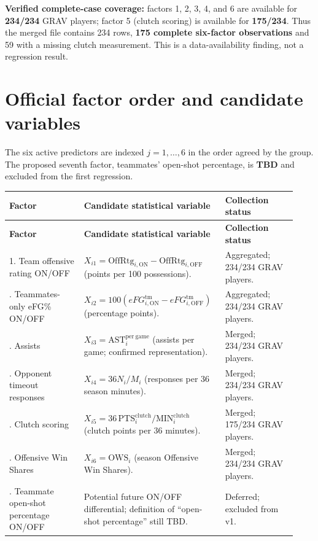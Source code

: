 \documentclass[11pt]{article}
\begin{document}
\textbf{Verified complete-case coverage:} factors 1, 2, 3, 4, and 6 are
available for \textbf{234/234} GRAV players; factor 5 (clutch scoring) is
available for \textbf{175/234}. Thus the merged file contains 234 rows,
\textbf{175 complete six-factor observations} and 59 with a missing clutch
measurement. This is a data-availability finding, not a regression result.

\section{Official factor order and candidate variables}
The six active predictors are indexed $j=1,\dots,6$ in the order agreed by
the group. The proposed seventh factor, teammates' open-shot percentage, is
\textbf{TBD} and excluded from the first regression.

\small
\begin{longtable}{@{}p{0.25\linewidth}p{0.44\linewidth}p{0.24\linewidth}@{}}
\toprule
\textbf{Factor} & \textbf{Candidate statistical variable} & \textbf{Collection status}\\
\midrule
\endfirsthead
\toprule
\textbf{Factor} & \textbf{Candidate statistical variable} & \textbf{Collection status}\\
\midrule
\endhead
1. Team offensive rating ON/OFF & $X_{i1}=\mathrm{OffRtg}_{i,\mathrm{ON}}-\mathrm{OffRtg}_{i,\mathrm{OFF}}$ (points per 100 possessions). & Aggregated; 234/234 GRAV players.\\
\addlinespace
2. Teammates-only eFG\% ON/OFF & $X_{i2}=100(eFG_{i,\mathrm{ON}}^{\mathrm{tm}}-eFG_{i,\mathrm{OFF}}^{\mathrm{tm}})$ (percentage points). & Aggregated; 234/234 GRAV players.\\
\addlinespace
3. Assists & $X_{i3}=\mathrm{AST}_{i}^{\mathrm{per\ game}}$ (assists per game; confirmed representation). & Merged; 234/234 GRAV players.\\
\addlinespace
4. Opponent timeout responses & $X_{i4}=36N_i/M_i$ (responses per 36 season minutes). & Merged; 234/234 GRAV players.\\
\addlinespace
5. Clutch scoring & $X_{i5}=36\,\mathrm{PTS}^{\mathrm{clutch}}_i/\mathrm{MIN}^{\mathrm{clutch}}_i$ (clutch points per 36 minutes). & Merged; 175/234 GRAV players.\\
\addlinespace
6. Offensive Win Shares & $X_{i6}=\mathrm{OWS}_i$ (season Offensive Win Shares). & Merged; 234/234 GRAV players.\\
\addlinespace
7. Teammate open-shot percentage ON/OFF & Potential future ON/OFF differential; definition of ``open-shot percentage'' still TBD. & Deferred; excluded from v1.\\
\bottomrule
\end{longtable}
\normalsize
\end{document}

